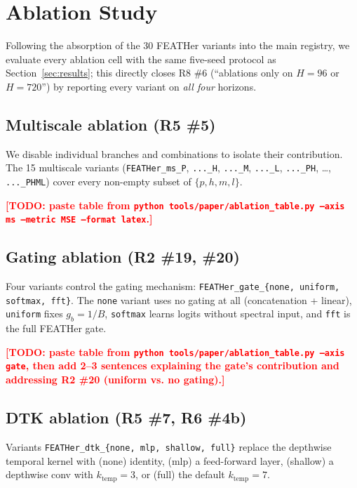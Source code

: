 \documentclass[journal]{IEEEtran}
\theoremstyle{remark}
\newcommand{\TODO}[1]{\textcolor{red}{\textbf{[TODO: #1]}}}
\begin{document}
\section{Ablation Study}
\label{sec:ablation}

Following the absorption of the 30 FEATHer variants into the main
registry, we evaluate every ablation cell with the same five-seed
protocol as Section~\ref{sec:results}; this directly closes
R8 \#6 (``ablations only on $H{=}96$ or $H{=}720$'') by reporting
every variant on \emph{all four} horizons.

\subsection{Multiscale ablation (R5 \#5)}
We disable individual branches and combinations to isolate their
contribution. The 15 multiscale variants
(\texttt{FEATHer\_ms\_P}, \texttt{...\_H}, \texttt{...\_M},
\texttt{...\_L}, \texttt{...\_PH}, \ldots, \texttt{...\_PHML}) cover
every non-empty subset of $\{p, h, m, l\}$.

\TODO{paste table from \texttt{python tools/paper/ablation\_table.py --axis ms --metric MSE --format latex}.}

\subsection{Gating ablation (R2 \#19, \#20)}
Four variants control the gating mechanism:
\texttt{FEATHer\_gate\_\{none, uniform, softmax, fft\}}. The
\texttt{none} variant uses no gating at all (concatenation +
linear), \texttt{uniform} fixes $g_b = 1/B$, \texttt{softmax}
learns logits without spectral input, and \texttt{fft} is the
full FEATHer gate.

\TODO{paste table from \texttt{python tools/paper/ablation\_table.py --axis gate}, then add 2--3 sentences explaining the gate's contribution and addressing R2 \#20 (uniform vs. no gating).}

\subsection{DTK ablation (R5 \#7, R6 \#4b)}
Variants \texttt{FEATHer\_dtk\_\{none, mlp, shallow, full\}}
replace the depthwise temporal kernel with (none) identity,
(mlp) a feed-forward layer, (shallow) a depthwise conv with
$k_{\text{temp}}{=}3$, or (full) the default $k_{\text{temp}}{=}7$.
\end{document}
